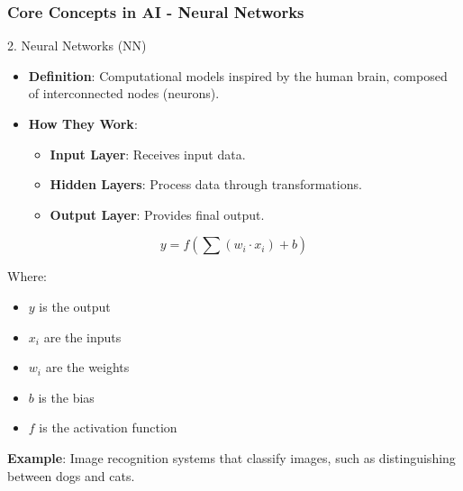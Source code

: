 \documentclass[aspectratio=169]{beamer}
\begin{document}
\begin{frame}[fragile]
    \frametitle{Core Concepts in AI - Neural Networks}
    \begin{block}{2. Neural Networks (NN)}
        \begin{itemize}
            \item \textbf{Definition}: Computational models inspired by the human brain, composed of interconnected nodes (neurons).
            \item \textbf{How They Work}:
                \begin{itemize}
                    \item \textbf{Input Layer}: Receives input data.
                    \item \textbf{Hidden Layers}: Process data through transformations.
                    \item \textbf{Output Layer}: Provides final output.
                \end{itemize}
        \end{itemize}
        
        \begin{equation}
            y = f\left( \sum (w_i \cdot x_i) + b \right)
        \end{equation}
        
        Where:
        \begin{itemize}
            \item $y$ is the output
            \item $x_i$ are the inputs
            \item $w_i$ are the weights
            \item $b$ is the bias
            \item $f$ is the activation function
        \end{itemize}
        \textbf{Example}: Image recognition systems that classify images, such as distinguishing between dogs and cats.
    \end{block}
\end{frame}
\end{document}

